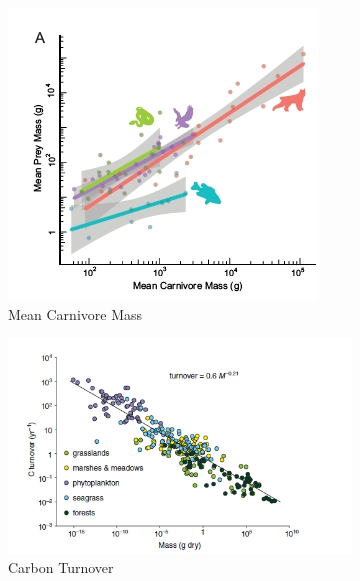 \documentclass[]{article}
\begin{document}
\begin{figure}[H]
	\caption{Scaling in individuals and	ecosystems}\label{fig:Scaling:individuals:ecosystems}
	\begin{subfigure}[b]{0.45\textwidth}
		\caption{Mean Carnivore Mass\cite{tucker2014evolutionary}}\label{fig:mcm}
		\includegraphics[width=\textwidth]{Scaling1}
	\end{subfigure}
	\begin{subfigure}[b]{0.45\textwidth}
		\caption{Carbon Turnover\cite{anderson2013altered}}\label{fig:ct}
		\includegraphics[width=\textwidth]{Scaling2}
	\end{subfigure}
	\begin{subfigure}[b]{0.45\textwidth}

\end{subfigure}
\end{figure}
\end{document}
